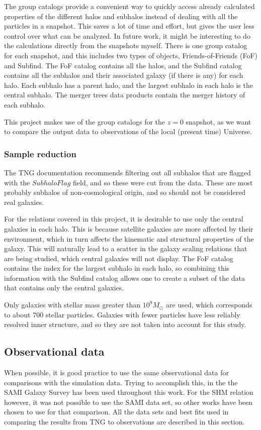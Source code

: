 The group catalogs provide a convenient way to quickly access already calculated properties of the different halos and subhalos instead of dealing with all the particles in a snapshot. This saves a lot of time and effort, but gives the user less control over what can be analyzed. In future work, it might be interesting to do the calculations directly from the snapshots myself. There is one group catalog for each snapshot, and this includes two types of objects, Friends-of-Friends (FoF) and Subfind. The FoF catalog contains all the halos, and the Subfind catalog contains all the subhalos and their associated galaxy (if there is any) for each halo. Each subhalo has a parent halo, and the largest subhalo in each halo is the central subhalo. The merger trees data products contain the merger history of each subhalo.

This project makes use of the group catalogs for the $z = 0$ snapshot, as we want to compare the output data to observations of the local (present time) Universe.

\subsubsection{Sample reduction}

The TNG documentation recommends filtering out all subhalos that are flagged with the $SubhaloFlag$ field, and so these were cut from the data. These are most probably subhalos of non-cosmological origin, and so should not be considered real galaxies.

For the relations covered in this project, it is desirable to use only the central galaxies in each halo. This is because satellite galaxies are more affected by their environment, which in turn affects the kinematic and structural properties of the galaxy. This will naturally lead to a scatter in the galaxy scaling relations that are being studied, which central galaxies will not display. The FoF catalog contains the index for the largest subhalo in each halo, so combining this information with the Subfind catalog allows one to create a subset of the data that contains only the central galaxies.

Only galaxies with stellar mass greater than $10^9 M_{\odot}$ are used, which corresponds to about 700 stellar particles. Galaxies with fewer particles have less reliably resolved inner structure, and so they are not taken into account for this study.

\subsection{Observational data}
When possible, it is good practice to use the same observational data for comparisons with the simulation data. Trying to accomplish this, in the the SAMI Galaxy Survey \parencite{Bryant2015} has been used throughout this work. For the SHM relation however, it was not possible to use the SAMI data set, so other works have been chosen to use for that comparison. All the data sets and best fits used in comparing the results from TNG to observations are described in this section.

